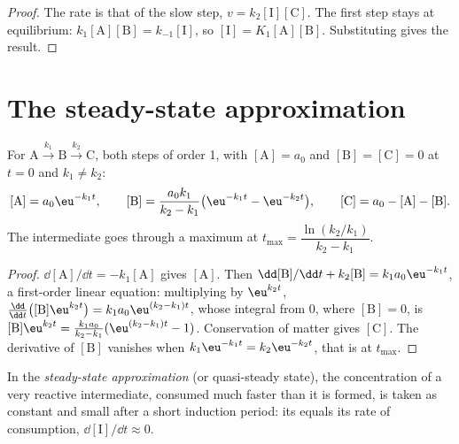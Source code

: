 \begin{proof}
The rate is that of the slow step, $v = k_2[\mathrm{I}][\mathrm{C}]$. The
first step stays at equilibrium: $k_1[\mathrm{A}][\mathrm{B}] =
k_{-1}[\mathrm{I}]$, so $[\mathrm{I}] = K_1[\mathrm{A}][\mathrm{B}]$.
Substituting gives the result.
\end{proof}

\section{The steady-state approximation}

\begin{theorem}\label{thm:b1:elementary-steps:consecutive}
For $\mathrm{A} \xrightarrow{k_1} \mathrm{B} \xrightarrow{k_2} \mathrm{C}$,
both steps of order 1, with $[\mathrm{A}] = a_0$ and $[\mathrm{B}] =
[\mathrm{C}] = 0$ at $t = 0$ and $k_1 \ne k_2$:
\[
  [\mathrm{A}] = a_0\eu^{-k_1t}, \qquad
  [\mathrm{B}] = \frac{a_0k_1}{k_2 - k_1}\big(\eu^{-k_1t} - \eu^{-k_2t}\big),
  \qquad [\mathrm{C}] = a_0 - [\mathrm{A}] - [\mathrm{B}] .
\]
The intermediate goes through a maximum at $t_{\max} = \dfrac{\ln(k_2/k_1)}
{k_2 - k_1}$.
\end{theorem}

\begin{proof}
$\dd[\mathrm{A}]/\dd t = -k_1[\mathrm{A}]$ gives $[\mathrm{A}]$. Then
$\dd[\mathrm{B}]/\dd t + k_2[\mathrm{B}] = k_1a_0\eu^{-k_1t}$, a first-order
linear equation: multiplying by $\eu^{k_2t}$, $\frac{\dd}{\dd t}
\big([\mathrm{B}]\eu^{k_2t}\big) = k_1a_0\eu^{(k_2-k_1)t}$, whose
integral from 0, where $[\mathrm{B}] = 0$, is $[\mathrm{B}]\eu^{k_2t} =
\frac{k_1a_0}{k_2-k_1}(\eu^{(k_2-k_1)t} - 1)$. Conservation of matter gives
$[\mathrm{C}]$. The derivative of $[\mathrm{B}]$ vanishes when $k_1\eu^{-k_1t}
= k_2\eu^{-k_2t}$, that is at $t_{\max}$.
\end{proof}

\begin{definition}\label{def:b1:elementary-steps:qssa}
In the \emph{steady-state approximation}
(or quasi-steady state), the concentration of a very
reactive intermediate, consumed much faster than it is formed, is taken
as constant and small after a short induction period: its  equals its rate of consumption,
$\dd[\mathrm{I}]/\dd t \approx 0$.
\end{definition}

